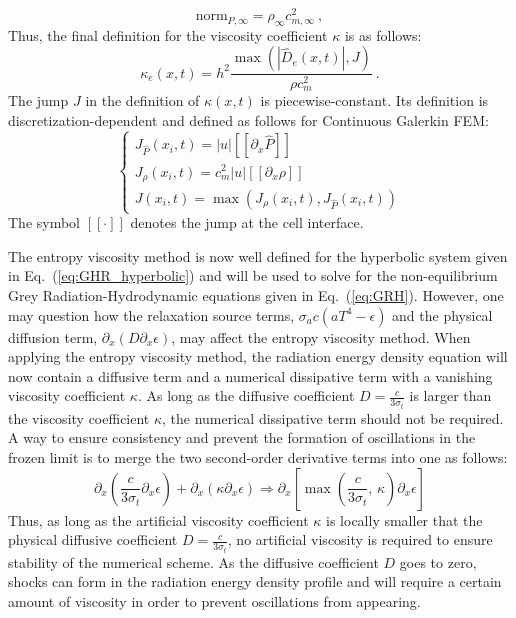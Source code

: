 \documentclass[review]{elsarticle}
\newcommand{\eqt}[1]{Eq.~(\ref{#1})}                     %
\newcommand{\norm}{\textrm{norm}}
\begin{document}
%
\begin{equation}
\norm_{P,\infty} = \rho_\infty c^2_{m,\infty} \nonumber \ ,
\end{equation}
%
Thus, the final definition for the viscosity coefficient $\kappa$ is as follows:
\begin{equation}
\label{eq:equation12bis}
\kappa_e(x,t) = h^2 \frac{\max (|\hat{D}_e(x,t)|, J)}{\rho c_m^2} \ .
\end{equation} 
The jump $J$ in the definition of $\kappa(x,t)$ is piecewise-constant. Its definition is discretization-dependent and defined as follows for Continuous Galerkin FEM: 
\begin{equation}
\label{eq:equation12ter}
\left\{
\begin{array}{lll}
J_{\hat{P}}(x_i,t) = |u| [[\partial_x \hat{P}]]\\
J_{\rho}(x_i,t) = c_m^2 |u|  [[\partial_x \rho]] \\
J(x_i,t) = \max( J_{\rho}(x_i,t), J_{\hat{P}}(x_i,t) )
\end{array}
\right.
\end{equation}
The symbol $[[ \cdot ]]$ denotes the jump at the cell interface.

The entropy viscosity method is now well defined for the hyperbolic system given in \eqt{eq:GHR_hyperbolic} and will be used to solve for the non-equilibrium Grey Radiation-Hydrodynamic equations given in \eqt{eq:GRH}. However, one may question how the relaxation source terms, $\sigma_a c (a T^4-\epsilon)$ and the physical diffusion term, $\partial_x(D\partial_x \epsilon)$, may affect the entropy viscosity method. When applying the entropy viscosity method, the radiation energy density equation will now contain a diffusive term and a numerical dissipative term with a vanishing viscosity coefficient $\kappa$. As long as the diffusive coefficient $D=\frac{c}{3 \sigma_t}$ is larger than the viscosity coefficient $\kappa$, the numerical dissipative term should not be required. A way to ensure consistency and prevent the formation of oscillations in the frozen limit is to merge the two second-order derivative terms into one as follows:
\begin{equation}
 \partial_x \left( \frac{c}{3 \sigma_t} \partial_x \epsilon \right) + \partial_x \left( \kappa \partial_x \epsilon \right) 
 \Longrightarrow
 \partial_x \left[ \max\left(\frac{c}{3 \sigma_t} \text{, } \kappa \right) \partial_x \epsilon \right]
\end{equation}
Thus, as long as the artificial viscosity coefficient $\kappa$ is locally smaller that the physical diffusive coefficient $D=\frac{c}{3 \sigma_t}$, no artificial viscosity is required to ensure stability of the numerical scheme. As the diffusive coefficient $D$ goes to zero, shocks can form in the radiation energy density profile and will require a certain amount of viscosity in order to prevent oscillations from appearing.
\end{document}
